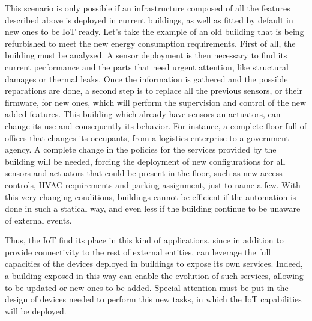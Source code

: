 This scenario is only possible if an infrastructure composed of all the features described above is deployed in current buildings, as well as fitted by default in new ones to be IoT ready.
Let's take the example of an old building that is being refurbished to meet the new energy consumption requirements.
First of all, the building must be analyzed.
A sensor deployment is then necessary to find its current performance and the parts that need urgent attention, like structural damages or thermal leaks.
Once the information is gathered and the possible reparations are done, a second step is to replace all the previous sensors, or their firmware, for new ones, which will perform the supervision and control of the new added features.
This building which already have sensors an actuators, can change its use and consequently its behavior.
For instance, a complete floor full of offices that changes its occupants, from a logistics enterprise to a government agency.
A complete change in the policies for the services provided by the building will be needed, forcing the deployment of new configurations for all sensors and actuators that could be present in the floor, such as new access controls, HVAC requirements and parking assignment, just to name a few.
With this very changing conditions, buildings cannot be efficient if the automation is done in such a statical way, and even less if the building continue to be unaware of external events.

Thus, the IoT find its place in this kind of applications, since in addition to provide connectivity to the rest of external entities, can leverage the full capacities of the devices deployed in buildings to expose its own services. Indeed, a building exposed in this way can enable the evolution of such services, allowing to be updated or new ones to be added.
Special attention must be put in the design of devices needed to perform this new tasks, in which the IoT capabilities will be deployed.

